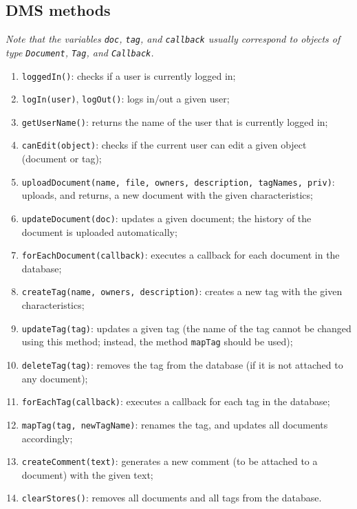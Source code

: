 \documentclass[a4,12pt]{article}
\begin{document}
\subsection*{DMS methods}

{\em Note that the variables \verb+doc+, \verb+tag+, and \verb+callback+ usually correspond to objects of type \verb+Document+, \verb+Tag+, and \verb+Callback+.}

\smallskip

\begin{enumerate}[- , noitemsep, topsep=-0.5em]
\item \verb+loggedIn()+: checks if a user is currently logged in;
\item \verb+logIn(user)+, \verb+logOut()+: logs in/out a given user;
\item \verb+getUserName()+: returns the name of the user that is currently logged in;
\item \verb+canEdit(object)+: checks if the current user can edit a given object (document or tag);
\item \verb+uploadDocument(name, file, owners, description, tagNames, priv)+: uploads, and returns, a new document with the given characteristics;
\item \verb+updateDocument(doc)+: updates a given document; the history of the document is uploaded automatically;
\item \verb+forEachDocument(callback)+: executes a callback for each document in the database;
\item \verb+createTag(name, owners, description)+: creates a new tag with the given characteristics;
\item \verb+updateTag(tag)+: updates a given tag (the name of the tag cannot be changed using this method; instead, the method \verb+mapTag+ should be used);
\item \verb+deleteTag(tag)+: removes the tag from the database (if it is not attached to any document);
\item \verb+forEachTag(callback)+: executes a callback for each tag in the database;
\item \verb+mapTag(tag, newTagName)+: renames the tag, and updates all documents accordingly;
\item \verb+createComment(text)+: generates a new comment (to be attached to a document) with the given text;
\item \verb+clearStores()+: removes all documents and all tags from the database.
\end{enumerate}
\end{document}
